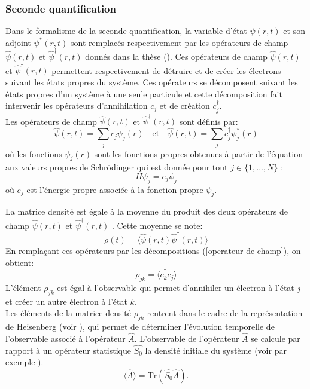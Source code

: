 \documentclass[12pt,a4paper,openany,oneside]{book}
\begin{document}
\subsubsection{Seconde quantiﬁcation} 
Dans le formalisme de la seconde quantiﬁcation, la variable d’état $ \psi(r,t)$ et son adjoint
$ \psi^{*}(r,t)$ sont remplacés respectivement par les opérateurs de champ $\hat{\psi}(r,t)$ et %
$\hat{\psi}^{\dagger}(r,t)$ donnés dans la thèse (\cite{mareference1}). Ces opérateurs de champ $\hat{\psi}(r,t)$ et $\hat{\psi}^{\dagger}(r,t)$ permettent respectivement de détruire et de créer les électrons suivant les états propres du système. Ces opérateurs se décomposent suivant les états propres d’un système à une seule particule et cette décomposition fait intervenir les opérateurs d’annihilation $c_{j}$ et de création $c_{j}^{\dagger}$.\\
Les opérateurs de champ $\hat{\psi}(r,t)$ et $\hat{\psi}^{\dagger}(r,t)$ sont définis  par:
\begin{equation}\label{operateur de champ}
\hat{\psi}(r,t)=\sum_{j}c_{j}\psi_{j}(r) \quad \textrm{et}\quad  \hat{\psi}(r,t)=\sum_{j}c_{j}^{\dagger}\psi_{j}^{*}(r) 
\end{equation} 
où les fonctions $ \psi_{j}(r) $ sont les fonctions propres obtenues à partir de l’équation aux valeurs propres de Schrödinger qui est donnée pour tout $j\in \{1, ..., N\} $ :
$$ H\psi_{j}= e_{j}\psi_{j} $$
où $ e_{j} $ est l’énergie propre associée à la fonction propre $ \psi_{j}$.
\par
La matrice densité est égale à la moyenne du produit des deux opérateurs de champ $\hat{\psi}(r,t)$ et $\hat{\psi}^{\dagger}(r,t)$ . Cette moyenne se note:
$$ \rho(t)=\langle\hat{\psi}(r,t)\hat{\psi}^{\dagger}(r,t) \rangle $$
En remplaçant ces opérateurs par les décompositions (\ref{operateur de champ}), on obtient:
$$ \rho_{jk}= \langle c_{k}^{\dagger}c_{j}\rangle $$
L’élément $\rho_{jk} $ est égal à l’observable qui permet d’annihiler un électron à l’état $ j $ et créer
un autre électron à l’état $ k $.\\
Les éléments de la matrice densité $ \rho_{jk} $ rentrent dans le cadre de la représentation de
Heisenberg (voir \cite{mareference15}), qui permet de déterminer l’évolution temporelle de l’observable associé à l’opérateur $ \hat{A}$. L’observable de l’opérateur $ \hat{A}$ se calcule par rapport à un opérateur statistique $ \hat{S_{0}}$ la densité initiale du système (voir par exemple \cite{mareference6}).
$$ \langle\hat{A}\rangle = \textrm{Tr}(\hat{S_{0}}\hat{A}).$$
\end{document}

